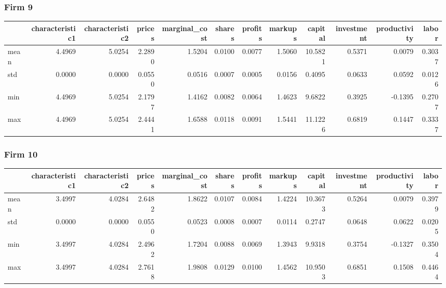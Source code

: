  \subsubsection*{Firm 9}
\begin{tabular}{lrrrrrrrrrrr}
\toprule
{} &  characteristic1 &  characteristic2 &  prices &  marginal\_cost &  shares &  profits &  markups &  capital &  investment &  productivity &  labor \\
\midrule
mean &           4.4969 &           5.0254 &  2.2890 &         1.5204 &  0.0100 &   0.0077 &   1.5060 &  10.5821 &      0.5371 &        0.0079 & 0.3037 \\
std  &           0.0000 &           0.0000 &  0.0550 &         0.0516 &  0.0007 &   0.0005 &   0.0156 &   0.4095 &      0.0633 &        0.0592 & 0.0126 \\
min  &           4.4969 &           5.0254 &  2.1797 &         1.4162 &  0.0082 &   0.0064 &   1.4623 &   9.6822 &      0.3925 &       -0.1395 & 0.2707 \\
max  &           4.4969 &           5.0254 &  2.4441 &         1.6588 &  0.0118 &   0.0091 &   1.5441 &  11.1226 &      0.6819 &        0.1447 & 0.3337 \\
\bottomrule
\end{tabular}


 \subsubsection*{Firm 10}
\begin{tabular}{lrrrrrrrrrrr}
\toprule
{} &  characteristic1 &  characteristic2 &  prices &  marginal\_cost &  shares &  profits &  markups &  capital &  investment &  productivity &  labor \\
\midrule
mean &           3.4997 &           4.0284 &  2.6482 &         1.8622 &  0.0107 &   0.0084 &   1.4224 &  10.3673 &      0.5264 &        0.0079 & 0.3979 \\
std  &           0.0000 &           0.0000 &  0.0550 &         0.0523 &  0.0008 &   0.0007 &   0.0114 &   0.2747 &      0.0648 &        0.0622 & 0.0205 \\
min  &           3.4997 &           4.0284 &  2.4962 &         1.7204 &  0.0088 &   0.0069 &   1.3943 &   9.9318 &      0.3754 &       -0.1327 & 0.3504 \\
max  &           3.4997 &           4.0284 &  2.7618 &         1.9808 &  0.0129 &   0.0100 &   1.4562 &  10.9503 &      0.6851 &        0.1508 & 0.4464 \\
\bottomrule
\end{tabular}


